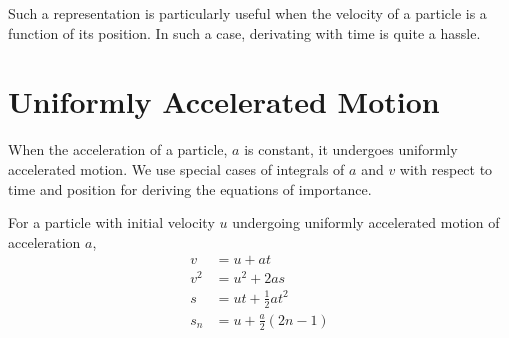 Such a representation is particularly useful when the velocity of a particle 
is a function of its position. In such a case, derivating with time is quite a hassle.

\section{Uniformly Accelerated Motion}

When the acceleration of a particle, \(a\) is constant, it undergoes uniformly accelerated motion.
We use special cases of integrals of \(a\) and \(v\) with respect to time and position for deriving
the equations of importance.

\begin{theorem}
    For a particle with initial velocity \(u\) undergoing uniformly accelerated motion of acceleration \(a\),
    \begin{align}
        v &= u + at \\
        v^2 &= u^2 + 2as \\
        s &= ut + \frac{1}{2} at^2 \\
        s_{n} &= u + \frac{a}{2}(2n - 1)
    \end{align}
\end{theorem}



